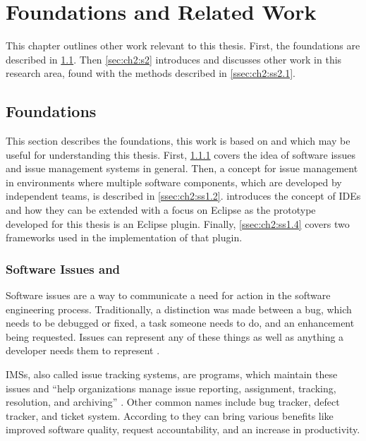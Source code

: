
\chapter{Foundations and Related Work}
\label{chap:ch2}
This chapter outlines other work relevant to this thesis.
First, the foundations are described in \cref{sec:ch2:s1}.
Then \cref{sec:ch2:s2} introduces and discusses other work in this research area, 
found with the methods described in \cref{ssec:ch2:ss2.1}.

\section{Foundations}
\label{sec:ch2:s1}
This section describes the foundations, this work is based on and which may be useful for understanding this thesis.
First, \cref{ssec:ch2:ss1.1} covers the idea of software issues and issue management systems in general.
Then, a concept for issue management in environments where multiple software components, 
which are developed by independent teams, is described in \cref{ssec:ch2:ss1.2}.
 introduces the concept of \glspl{IDE} and how they can be extended 
with a focus on \gls{Eclipse} as the prototype developed for this thesis is an \gls{Eclipse} plugin.
Finally, \cref{ssec:ch2:ss1.4} covers two frameworks used in the implementation of that plugin.

\subsection{Software Issues and }
\label{ssec:ch2:ss1.1}
Software issues are a way to communicate a need for action in the software engineering process.
Traditionally, a distinction was made between a bug, which needs to be debugged or fixed, a task someone needs to do, 
and an enhancement being requested.
Issues can represent any of these things as well as anything a developer needs them to represent \cite{Atlassian2020Issue,Github2020Issues}.

\glspl{IMS}, also called issue tracking systems, are programs, which maintain these issues 
and ``help organizations manage issue reporting, assignment, tracking, resolution, and archiving'' \cite{bertram2010communication}.
Other common names include bug tracker, defect tracker, and ticket system.
According to \cite{janak2009issue} they can bring various benefits like improved software quality, request accountability, and 
an increase in productivity. 

